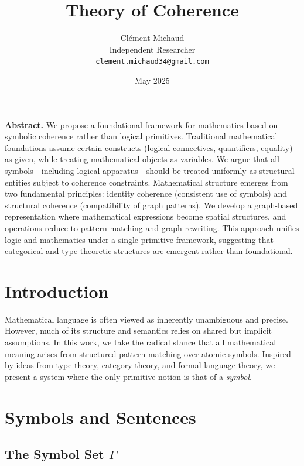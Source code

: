 \documentclass{article}
\title{Theory of Coherence}
\author{
Clément Michaud \\
Independent Researcher\\
\texttt{clement.michaud34@gmail.com}
}
\date{May 2025}
\theoremstyle{definition}
\begin{document}
\maketitle

\begin{center}
\begin{minipage}{0.9\textwidth}
\small
\textbf{Abstract.} We propose a foundational framework for mathematics based on symbolic coherence rather than logical primitives. Traditional mathematical foundations assume certain constructs (logical connectives, quantifiers, equality) as given, while treating mathematical objects as variables. We argue that all symbols—including logical apparatus—should be treated uniformly as structural entities subject to coherence constraints. Mathematical structure emerges from two fundamental principles: identity coherence (consistent use of symbols) and structural coherence (compatibility of graph patterns). We develop a graph-based representation where mathematical expressions become spatial structures, and operations reduce to pattern matching and graph rewriting. This approach unifies logic and mathematics under a single primitive framework, suggesting that categorical and type-theoretic structures are emergent rather than foundational.
\end{minipage}
\end{center}

\vspace{10pt}


\section{Introduction}

Mathematical language is often viewed as inherently unambiguous and precise. However, much of its structure and semantics relies on shared but implicit assumptions. In this work, we take the radical stance that all mathematical meaning arises from structured pattern matching over atomic symbols. Inspired by ideas from type theory, category theory, and formal language theory, we present a system where the only primitive notion is that of a \emph{symbol}.

\section{Symbols and Sentences}

\subsection{The Symbol Set \texorpdfstring{$\Gamma$}{Gamma}}
\end{document}
